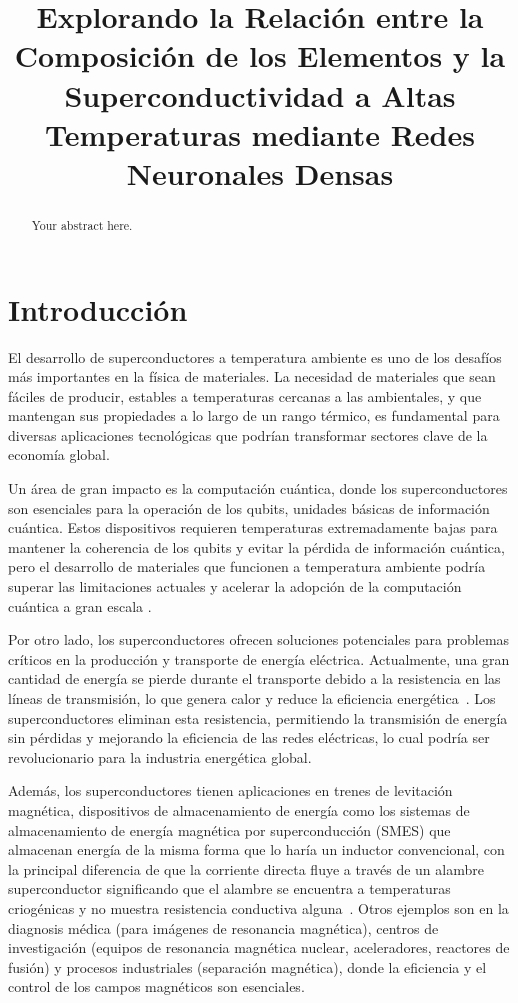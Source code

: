 \documentclass[conference]{IEEEtran} %
\title{Explorando la Relación entre la Composición de los Elementos y la Superconductividad a Altas Temperaturas mediante Redes Neuronales Densas}
\author{\IEEEauthorblockN{Eber David Gayt\'an Medina}
\IEEEauthorblockA{\textit{Centro de Investigación Científica y de Educación Superior de Ensenada - Introducci\'on a la Ciencia de Datos} \\
eber@cicese.edu.mx}

}
\begin{document}
\maketitle

\begin{abstract}
Your abstract here.
\end{abstract}

\section{Introducción}

El desarrollo de superconductores a temperatura ambiente es uno de los desafíos más 
importantes en la física de materiales. La necesidad de materiales que sean fáciles 
de producir, estables a temperaturas cercanas a las ambientales, y que mantengan sus 
propiedades a lo largo de un rango térmico, es fundamental para diversas aplicaciones 
tecnológicas que podrían transformar sectores clave de la economía global.

Un área de gran impacto es la computación cuántica, donde los superconductores son 
esenciales para la operación de los qubits, unidades básicas de información cuántica. 
Estos dispositivos requieren temperaturas extremadamente bajas para mantener la 
coherencia de los qubits y evitar la pérdida de información cuántica, pero el 
desarrollo de materiales que funcionen a temperatura ambiente podría superar las 
limitaciones actuales y acelerar la adopción de la computación cuántica a gran 
escala \cite{Bassman_Oftelie_2024}.

Por otro lado, los superconductores ofrecen soluciones potenciales para problemas 
críticos en la producción y transporte de energía eléctrica. Actualmente, una 
gran cantidad de energía se pierde durante el transporte debido a la resistencia 
en las líneas de transmisión, lo que genera calor y reduce la eficiencia energética~\cite{sarajcev2000calculation}. 
Los superconductores eliminan esta resistencia, permitiendo la transmisión de energía 
sin pérdidas y mejorando la eficiencia de las redes eléctricas, lo cual podría ser
revolucionario para la industria energética global.

Además, los superconductores tienen aplicaciones en trenes de levitación magnética, 
dispositivos de almacenamiento de energía como los sistemas de almacenamiento de energía magnética por
superconducción (SMES) que almacenan energía de la misma forma que
lo haría un inductor convencional, con la principal diferencia de que
la corriente directa fluye a través de un alambre superconductor significando
que el alambre se encuentra a temperaturas criogénicas
y no muestra resistencia conductiva alguna~\cite{gonzalez2013almacenamiento}. Otros ejemplos son en la 
diagnosis médica (para imágenes de resonancia magnética), centros de
investigación (equipos de resonancia magnética nuclear, aceleradores, reactores de fusión) y
procesos industriales (separación magnética), donde la eficiencia y el control de los 
campos magnéticos son esenciales.
\end{document}
